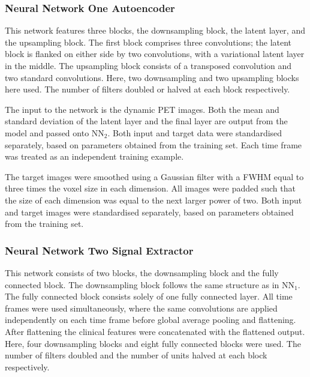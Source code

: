            \subsubsection{Neural Network One Autoencoder} \label{sec:a_bayesian_neural_network-based_method_for_the_extraction_of_a_metabolite_corrected_arterial_input_function_from_dynamic_pbr28_pet_appendix_methods_neural_network_design_neural_network_one_autoencoder}
                This network features three blocks, the downsampling block, the latent layer, and the upsampling block. The first block comprises three convolutions; the latent block is flanked on either side by two convolutions, with a variational latent layer in the middle. The upsampling block consists of a transposed convolution and two standard convolutions. Here, two downsampling and two upsampling blocks here used. The number of filters doubled or halved at each block respectively.
            
                The input to the network is the dynamic \gls{PET} images. Both the mean and standard deviation of the latent layer and the final layer are output from the model and passed onto \gls{NN}$_2$. Both input and target data were standardised separately, based on parameters obtained from the training set. Each time frame was treated as an independent training example.
    
                The target images were smoothed using a Gaussian filter with a \gls{FWHM} equal to three times the voxel size in each dimension. All images were padded such that the size of each dimension was equal to the next larger power of two. Both input and target images were standardised separately, based on parameters obtained from the training set.

            \subsubsection{Neural Network Two Signal Extractor} \label{sec:a_bayesian_neural_network-based_method_for_the_extraction_of_a_metabolite_corrected_arterial_input_function_from_dynamic_pbr28_pet_appendix_methods_neural_network_design_neural_network_two_signal_extractor}
                This network consists of two blocks, the downsampling block and the fully connected block. The downsampling block follows the same structure as in \gls{NN}$_1$. The fully connected block consists solely of one fully connected layer. All time frames were used simultaneously, where the same convolutions are applied independently on each time frame before global average pooling and flattening. After flattening the clinical features were concatenated with the flattened output. Here, four downsampling blocks and eight fully connected blocks were used. The number of filters doubled and the number of units halved at each block respectively.

